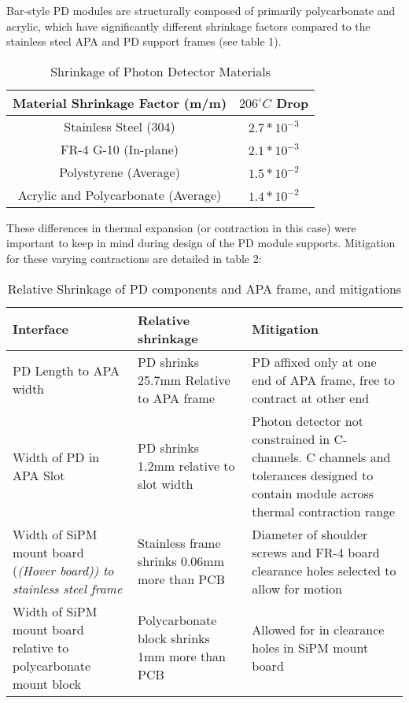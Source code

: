 Bar-style PD modules are structurally composed of primarily polycarbonate and 
acrylic, which have significantly different shrinkage factors compared to the 
stainless steel APA and PD support frames (see table 1).


\begin{table}[h!]
\label{tbl:fdsfpdshrink}
\begin{center}
\caption{Shrinkage of Photon Detector Materials}
\begin{tabular}{|c|c|}
\hline
\textbf{Material Shrinkage Factor (m/m)} & \textbf{$206^{\circ}C$ Drop}\\
\hline
Stainless Steel (304) & $2.7*10^{-3}$\\
FR-4 G-10 (In-plane) & $2.1*10^{-3}$\\
Polystyrene (Average) & $1.5*10^{-2}$\\
Acrylic and Polycarbonate (Average) & $1.4*10^{-2}$\\
\hline
\end{tabular}
\end{center}
\end{table}

These differences in thermal expansion (or contraction in this case) were 
important to keep in mind during design of the PD module supports.  
Mitigation for these varying contractions are detailed in table 2:


\begin{table}[h!]
\label{tbl:fdsfpdshrinkeffects}
\begin{center}
\caption{Relative Shrinkage of PD components and APA frame, and mitigations}
\begin{tabular}{|p{}|p{}|p{}}
\hline
\textbf{Interface} & \textbf{Relative shrinkage} & \textbf{Mitigation} \\
\hline
PD Length to APA width & PD shrinks 25.7mm Relative to APA frame & PD affixed only at one end of APA frame, free to contract at other end \\
\hline
Width of PD in APA Slot & PD shrinks 1.2mm relative to slot width & Photon detector not constrained in C-channels. C channels and tolerances designed to contain module across thermal contraction range \\
\hline
Width of SiPM mount board (\it(Hover board)) to stainless steel frame & Stainless frame shrinks 0.06mm more than PCB & Diameter of shoulder screws and FR-4 board clearance holes selected to allow for motion \\
\hline
Width of SiPM mount board relative to polycarbonate mount block & Polycarbonate block shrinks 1mm more than PCB & Allowed for in clearance holes in SiPM mount board \\
\hline
\end{tabular}
\end{center}
\end{table}


